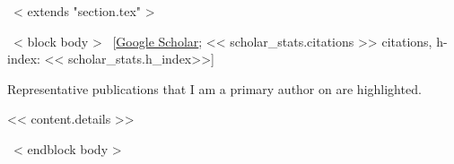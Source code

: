 ~< extends "section.tex" >~

~< block body >~
\vspace{-8.2mm}\hspace{30mm}[\href{https://scholar.google.com/citations?user=<< scholar_id >>}{Google Scholar};
<< scholar_stats.citations >> citations, h-index: << scholar_stats.h_index>>]\vspace{3mm}


Representative publications that I am a primary author on are
\colorbox{tab_highlight}{highlighted.}




<< content.details >>

~< endblock body >~